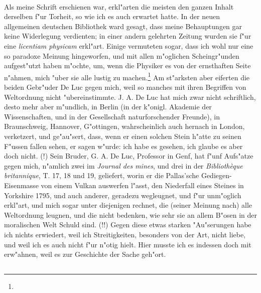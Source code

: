 \documentclass[a4paper, 11pt, oneside, polutonikogreek, german]{article}
\begin{document}
\paragraph{}
Als meine Schrift erschienen war, erkl"arten die meisten den ganzen Inhalt derselben f"ur Torheit, so wie ich es auch erwartet hatte. In der neuen allgemeinen deutschen Bibliothek ward gesagt, dass meine Behauptungen gar keine Widerlegung verdienten; in einer andern gelehrten Zeitung wurden sie f"ur eine \emph{licentiam physicam} erkl"art. Einige vermuteten sogar, dass ich wohl nur eine so paradoxe Meinung hingeworfen, und mit allen m"oglichen Scheingr"unden aufgest"utzt haben m"ochte, um, wenn die Physiker es von der ernsthaften Seite n"ahmen, mich "uber sie alle lustig zu machen.\footnote{} Am st"arksten aber eiferten die beiden Gebr"uder De Luc gegen mich, weil so manches mit ihren Begriffen von Weltordnung nicht "ubereinstimmte. J. A. De Luc hat mich zwar nicht schriftlich, desto mehr aber m"undlich, in Berlin (in der k"onigl. Akademie der Wissenschaften, und in der Gesellschaft naturforschender Freunde), in Braunschweig, Hannover, G"ottingen, wahrscheinlich auch hernach in London, verketzert, und ge"au"sert, dass, wenn er einen solchen Stein h"atte zu seinen F"ussen fallen sehen, er sagen w"urde: ich habe es gesehen, ich glaube es aber doch nicht. (!) Sein Bruder, G. A. De Luc, Professor in Genf, hat f"unf Aufs"atze gegen mich, n"amlich zwei im \emph{Journal des mines}, und drei in der \emph{Bibliothèque britannique}, T. 17, 18 und 19, geliefert, worin er die Pallas'sche Gediegen-Eisenmasse von einem Vulkan auswerfen l"asst, den Niederfall eines Steines in Yorkshire 1795, und auch anderer, geradezu wegleugnet, und f"ur unm"oglich erkl"art, und mich sogar unter diejenigen rechnet, die (seiner Meinung nach) alle Weltordnung leugnen, und die nicht bedenken, wie sehr sie an allem B"osen in der moralischen Welt Schuld sind. (!!) Gegen diese etwas starken "Au"serungen habe ich nichts erwiedert, weil ich Streitigkeiten, besonders von der Art, nicht liebe, und weil ich es auch nicht f"ur n"otig hielt. Hier musste ich es indessen doch mit erw"ahnen, weil es zur Geschichte der Sache geh"ort.
\subsection{}
\end{document}
